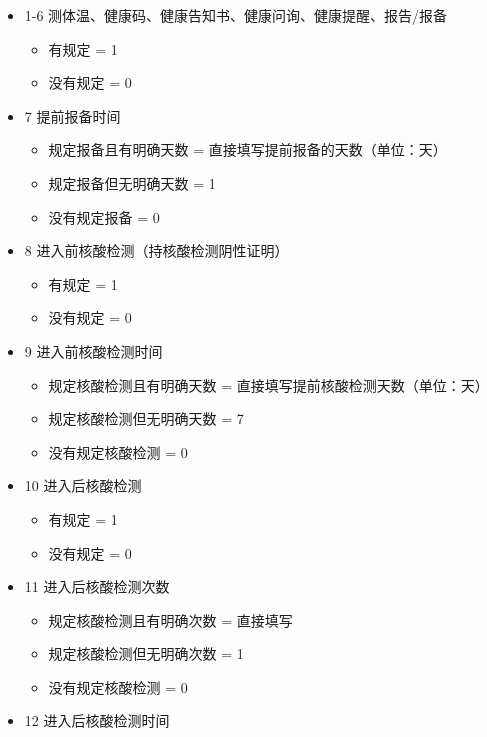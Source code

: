 \documentclass[
  12pt,
]{ctexart}
\providecommand{\tightlist}{%
  \setlength{\itemsep}{0pt}\setlength{\parskip}{0pt}}
\begin{document}
\begin{itemize}
\tightlist
\item
  1-6 测体温、健康码、健康告知书、健康问询、健康提醒、报告/报备

  \begin{itemize}
  \tightlist
  \item
    有规定 = 1
  \item
    没有规定 = 0
  \end{itemize}
\item
  7 提前报备时间

  \begin{itemize}
  \tightlist
  \item
    规定报备且有明确天数 = 直接填写提前报备的天数（单位：天）
  \item
    规定报备但无明确天数 = 1
  \item
    没有规定报备 = 0
  \end{itemize}
\item
  8 进入前核酸检测（持核酸检测阴性证明）

  \begin{itemize}
  \tightlist
  \item
    有规定 = 1
  \item
    没有规定 = 0
  \end{itemize}
\item
  9 进入前核酸检测时间

  \begin{itemize}
  \tightlist
  \item
    规定核酸检测且有明确天数 = 直接填写提前核酸检测天数（单位：天）
  \item
    规定核酸检测但无明确天数 = 7
  \item
    没有规定核酸检测 = 0
  \end{itemize}
\item
  10 进入后核酸检测

  \begin{itemize}
  \tightlist
  \item
    有规定 = 1
  \item
    没有规定 = 0
  \end{itemize}
\item
  11 进入后核酸检测次数

  \begin{itemize}
  \tightlist
  \item
    规定核酸检测且有明确次数 = 直接填写
  \item
    规定核酸检测但无明确次数 = 1
  \item
    没有规定核酸检测 = 0
  \end{itemize}
\item
  12 进入后核酸检测时间


\end{itemize}
\end{document}
